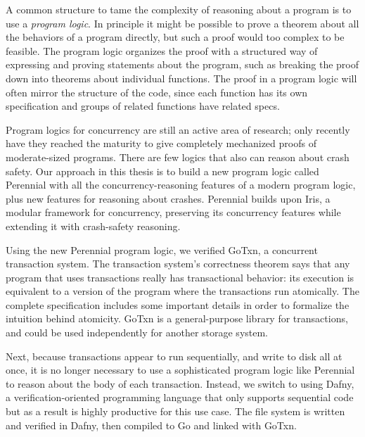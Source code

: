 A common structure to tame the complexity of reasoning about a program is to use
a \emph{program logic}. In principle it might be possible to prove a theorem
about all the behaviors of a program directly, but such a proof would too
complex to be feasible. The program logic organizes the proof with a structured
way of expressing and proving statements about the program, such as breaking the
proof down into theorems about individual functions. The proof in a program
logic will often mirror the structure of the code, since each function has its
own specification and groups of related functions have related specs.

Program logics for concurrency are still an active area of research; only
recently have they reached the maturity to give completely mechanized proofs of
moderate-sized programs. There are few logics that also can reason about crash
safety. Our approach in this thesis is to build a new program logic called Perennial with all the
concurrency-reasoning features of a modern program logic, plus new features for
reasoning about crashes. Perennial builds upon Iris, a modular framework for
concurrency, preserving its concurrency features while extending it with
crash-safety reasoning.

Using the new Perennial program logic, we verified GoTxn, a concurrent transaction system.
The transaction system's correctness theorem says that any program that uses
transactions really has transactional behavior: its execution is equivalent to a
version of the program where the transactions run atomically. The complete
specification includes some important details in order to formalize the
intuition behind atomicity. GoTxn is a general-purpose library for transactions,
and could be used independently for another storage system.

Next, because transactions appear to run sequentially, and write to disk all at
once, it is no longer necessary to use a sophisticated program logic like
Perennial to reason about the body of each transaction. Instead, we switch to
using Dafny, a verification-oriented programming language that only supports
sequential code but as a result is highly productive for this use case. The file
system is written and verified in Dafny, then compiled to Go and linked with
GoTxn.


